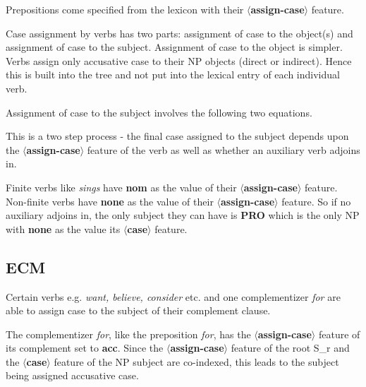 
Prepositions come specified from the lexicon with their {\bf $\langle$assign-case$\rangle$}
feature.



Case assignment by verbs has two parts: assignment of case to the object(s) and
assignment of case to the subject. Assignment of case to the object is simpler.
Verbs assign only accusative case to their NP objects (direct or indirect).
Hence this is built into the tree and not put into the lexical entry of
each individual verb.


Assignment of case to the subject involves the following two equations.




This is a two step process - the final case assigned to the subject depends upon
the {\bf $\langle$assign-case$\rangle$} feature of the verb as well as whether an
auxiliary verb adjoins in. 

Finite verbs like {\em sings} have {\bf nom} as the value of their
{\bf $\langle$assign-case$\rangle$} feature. Non-finite verbs have {\bf none}
as the value of their
{\bf $\langle$assign-case$\rangle$} feature. So if no auxiliary adjoins in,
the only subject they can have is {\bf PRO} which is the only NP with
{\bf none}
as the value its {\bf $\langle$case$\rangle$} feature.

\subsection{ECM}
Certain verbs e.g. {\em want, believe, consider} etc. and one complementizer
{\em for} are able to assign case to the subject of their complement clause. 

The complementizer {\em for}, like the preposition {\em for}, has the 
{\bf $\langle$assign-case$\rangle$} feature of its complement set
to {\bf acc}. Since the {\bf $\langle$assign-case$\rangle$} feature of
the root S_{r} and the {\bf $\langle$case$\rangle$} feature of the 
NP subject are co-indexed, this leads to the subject being assigned 
accusative case.

